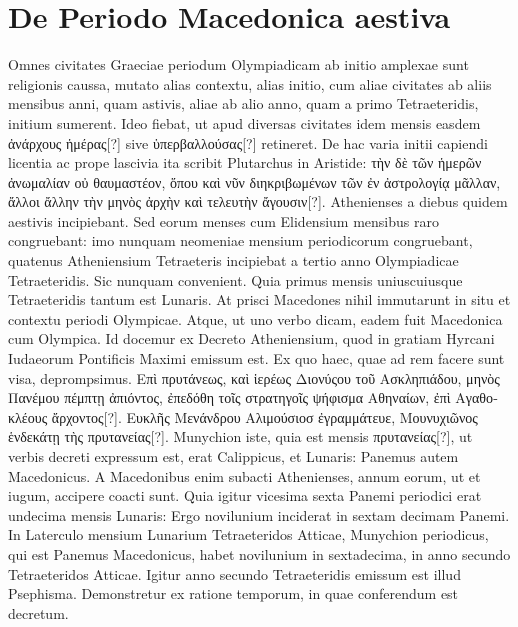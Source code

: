 \section{De Periodo Macedonica aestiva}
Omnes civitates Graeciae periodum Olympiadicam ab initio
amplexae sunt religionis caussa, mutato alias contextu, alias
initio, cum aliae civitates ab aliis mensibus anni, quam astivis,
aliae ab alio anno, quam a primo Tetraeteridis, initium sumerent.
Ideo
fiebat, ut apud diversas civitates idem mensis easdem
 \textgreek{ἀνάρχους ἡμέρας[?]}
sive \textgreek{ὑπερβαλλούσας[?]} retineret.
De hac varia initii capiendi licentia ac
prope lascivia ita scribit Plutarchus in Aristide:
 \textgreek{τὴν δὲ τῶν ἡμερῶν ἀνωμαλίαν
οὐ θαυμαστέον, ὅπου καὶ νῦν διηκριβωμένων τῶν ἐν ἀστρολογίᾳ μᾶλλαν,
ἄλλοι ἄλλην τὴν μηνὸς ἀρχὴν καὶ τελευτὴν ἄγουσιν[?]}.
Athenienses a diebus
quidem aestivis incipiebant.
Sed eorum menses cum Elidensium
mensibus raro congruebant: imo nunquam neomeniae mensium periodicorum
congruebant, quatenus Atheniensium Tetraeteris incipiebat
a tertio anno Olympiadicae Tetraeteridis.
Sic nunquam convenient.
Quia primus mensis uniuscuiusque Tetraeteridis tantum est
Lunaris.
At prisci Macedones nihil immutarunt in situ et contextu
periodi Olympicae.
Atque, ut uno verbo dicam, eadem fuit Macedonica
cum Olympica.
Id docemur ex Decreto Atheniensium, quod in
gratiam Hyrcani Iudaeorum Pontificis Maximi emissum est.
Ex quo
haec, quae ad rem facere sunt visa, deprompsimus.
\textgreek{Επὶ πρυτάνεως, καὶ ἱερέως
Διονύςου τοῦ Ασκληπιάδου, μηνὸς Πανέμου πέμπτῃ ἀπιόντος, ἐπεδόθη τοῖς στρατηγοῖς
ψήφισμα Αθηναίων, ἐπὶ Αγαθοκλέους ἄρχοντος[?]}.
\textgreek{Ευκλῆς Μενάνδρου
Αλιμούσιοσ ἐγραμμάτευε, Μουνυχιῶνος ἑνδεκάτῃ τὴς πρυτανείας[?]}.
Munychion
iste, quia est mensis \textgreek{πρυτανείας[?]},
 ut verbis decreti expressum est,
erat Calippicus, et Lunaris: Panemus autem Macedonicus.
A Macedonibus
enim subacti Athenienses, annum eorum, ut et iugum, accipere
coacti sunt.
Quia igitur vicesima sexta Panemi periodici erat undecima
mensis Lunaris: Ergo novilunium inciderat in sextam decimam
Panemi.
In Laterculo mensium Lunarium Tetraeteridos Atticae,
Munychion periodicus, qui est Panemus Macedonicus, habet novilunium
in sextadecima, in anno secundo Tetraeteridos Atticae.
Igitur anno
secundo Tetraeteridis emissum est illud Psephisma.
Demonstretur
ex ratione temporum, in quae conferendum est decretum.
